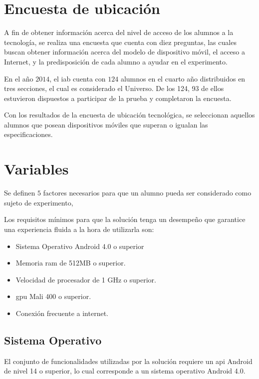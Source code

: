 
\section{Encuesta de ubicación}
\label{sec:ubicacion}

A fin de obtener información acerca del nivel de acceso  de los alumnos a la
tecnología, se realiza una encuesta que cuenta con diez preguntas, las cuales
buscan obtener información acerca del modelo de dispositivo móvil, el acceso a
Internet, y la predisposición de cada alumno a ayudar en el experimento.

En el año $2014$, el \Gls{iab} cuenta con $124$ alumnos en el cuarto año distribuidos en
tres secciones, el cual es considerado el Universo. De los 124, 93 de
ellos estuvieron dispuestos a participar de la prueba y completaron la encuesta.

Con los resultados de la encuesta de ubicación tecnológica, se seleccionan
aquellos alumnos que posean dispositivos móviles que superan o igualan las
especificaciones.


\section{Variables}

Se definen $5$ factores necesarios para que un alumno pueda ser considerado como
sujeto de experimento, 

Los requisitos mínimos para que la solución tenga un desempeño que garantice una
experiencia fluida a la hora de utilizarla son:

\begin{itemize}
    \item Sistema Operativo Android 4.0 o superior
    \item Memoria ram de 512MB o superior.
    \item Velocidad de procesador de 1 GHz o superior.
    \item \Gls{gpu} Mali 400 o superior.
    \item Conexión frecuente a internet.
\end{itemize}

\subsection{Sistema Operativo}

El conjunto de funcionalidades utilizadas por la solución requiere un \Gls{api}
Android de nivel 14\cite{android:api} o superior, lo cual corresponde a un
sistema operativo Android 4.0.
